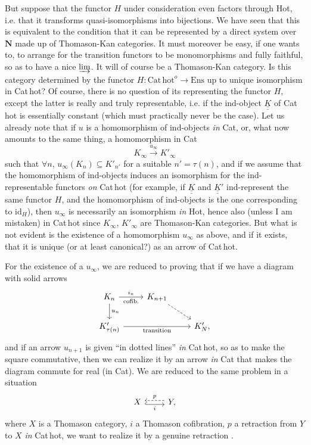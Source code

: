 \documentclass[11pt]{article}
\newcommand{\printedpage}[1]{\marginpar{\footnotesize p.~#1}}
\newcommand{\msp}[1]{\marginpar{\footnotesize [#1]}}
\newcommand{\Cathot}{\mathrm{Cat\,hot}}
\newcommand{\uuK}{\underline{\underline{K}}}
\newcommand{\Ens}{\mathrm{Ens}}
\begin{document}
But suppose that the functor $H$ under consideration even factors through Hot, i.e. that it transforms quasi-isomorphisms into bijections. We have seen that this is equivalent to the condition that it can be represented by a direct system over $\mathbf{N}$ made up of Thomason-Kan categories. It must moreover be easy, if one wants to, to arrange for the transition functors to be monomorphisms and fully faithful, so as to have a nice $\varinjlim$. It will of course be a Thomason-Kan category. Is this category determined by the functor $H : \Cathot^{o} \longrightarrow \Ens$ up to unique isomorphism in Cat\,hot? Of course, there is no question of its representing the functor $H$, except the latter is really and truly representable, i.e. if the ind-object $\uuK$ of Cat\,hot is essentially constant (which must practically never be the case). Let us already note
\printedpage{30}
\msp{page 47}
that if $u$ is a homomorphism of ind-objects \textit{in} Cat, or, what now amounts to the same thing, a homomorphism in Cat %
\[
K_\infty \xrightarrow{u_\infty} K'_\infty
\]
such that $\forall n$, $u_\infty(K_n) \subseteq K'_{n'}$ for a suitable $n' = \tau(n)$, and if we assume that the homomorphism of ind-objects induces an isomorphism for the ind-representable functors \textit{on} Cat\,hot (for example, if $\uuK$ and $\uuK'$ ind-represent the same functor $H$, and the homomorphism of ind-objects is the one corresponding to $\mathrm{id}_H$), then $u_\infty$ is necessarily an isomorphism \textit{in} Hot, hence also (unless I am mistaken) in Cat\,hot since $K_\infty$, $K'_\infty$ are Thomason-Kan categories. But what is not evident is the existence of a homomorphism $u_\infty$ as above, and if it exists, that it is unique (or at least canonical?) as an arrow of Cat\,hot.

For the existence of a $u_\infty$, we are reduced to proving that if we have a diagram with solid arrows
\[
\begin{tikzcd}
K_n \arrow[r, "i_n", "\text{cofib.}"'] \arrow[d, "u_n"] & K_{n+1} \arrow[dr, dashed] & \\
K'_{\tau(n)} \arrow[rr, "\text{transition}"'] & & K'_N ,
\end{tikzcd}
\]
and if an arrow $u_{n+1}$ is given ``in dotted lines'' \textit{in} Cat\,hot, so as to make the square commutative,
\msp{page 48}
then we can realize it by an arrow \textit{in} Cat that makes the diagram commute for real (in Cat). We are reduced to the same problem in a situation
\[
\begin{tikzcd}
X \arrow[r, hook, shift right, "i"'] & Y , \arrow[l, dashed, shift right, "p"']
\end{tikzcd}
\]
where $X$ is a Thomason category, $i$ a Thomason cofibration, $p$ a retraction from $Y$ to $X$ \textit{in} Cat\,hot, we want to realize it by a genuine retraction .
\end{document}
